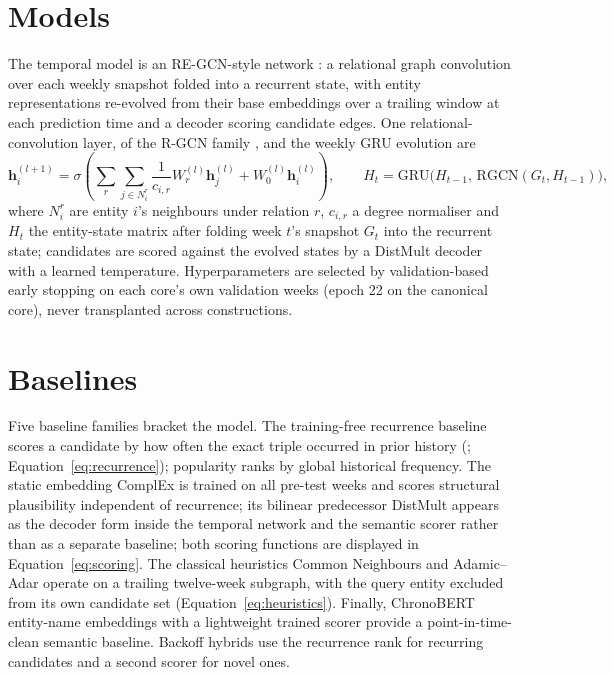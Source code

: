 \documentclass[a4paper,12pt]{report}
\begin{document}
\section{Models}
The temporal model is an RE-GCN-style network \citep{Li2021REGCN}: a
relational graph convolution over each weekly snapshot folded into a
recurrent state, with entity representations re-evolved from their base
embeddings over a trailing window at each prediction time and a decoder
scoring candidate edges. One relational-convolution layer, of the R-GCN
family \citep{Schlichtkrull2018RGCN}, and the weekly GRU evolution
\citep{Cho2014GRU} are
\begin{equation}
\mathbf{h}_i^{(l+1)} = \sigma\!\left( \sum_{r} \sum_{j \in N_i^r}
\frac{1}{c_{i,r}} W_r^{(l)} \mathbf{h}_j^{(l)} + W_0^{(l)}
\mathbf{h}_i^{(l)} \right), \qquad
H_t = \mathrm{GRU}\bigl(H_{t-1},\, \mathrm{RGCN}(G_t, H_{t-1})\bigr),
\label{eq:regcn}
\end{equation}
where $N_i^r$ are entity $i$'s neighbours under relation $r$, $c_{i,r}$ a
degree normaliser and $H_t$ the entity-state matrix after folding week
$t$'s snapshot $G_t$ into the recurrent state; candidates are scored
against the evolved states by a DistMult decoder with a learned
temperature. Hyperparameters are selected by validation-based
early stopping on each core's own validation weeks (epoch 22 on the canonical
core), never transplanted across constructions.

\section{Baselines}
Five baseline families bracket the model. The training-free
recurrence baseline scores a candidate by how often the exact triple
occurred in prior history (\citealp{Gastinger2024Recurrence};
Equation~\ref{eq:recurrence}); popularity
ranks by global historical frequency. The static embedding ComplEx
\citep{Trouillon2016ComplEx} is trained on all pre-test weeks and scores
structural plausibility independent of recurrence; its bilinear predecessor
DistMult \citep{Yang2015DistMult} appears as the decoder form inside the
temporal network and the semantic scorer rather than as a separate baseline;
both scoring functions are displayed in Equation~\ref{eq:scoring}. The classical heuristics Common Neighbours and Adamic--Adar
\citep{AdamicAdar2003, LibenNowell2007} operate on a trailing twelve-week
subgraph, with the query entity excluded from its own candidate set
(Equation~\ref{eq:heuristics}). Finally,
ChronoBERT entity-name embeddings \citep{He2025Chrono} with a lightweight
trained scorer provide a point-in-time-clean semantic baseline.
Backoff hybrids use the recurrence rank for recurring candidates and a second
scorer for novel ones.
\end{document}
